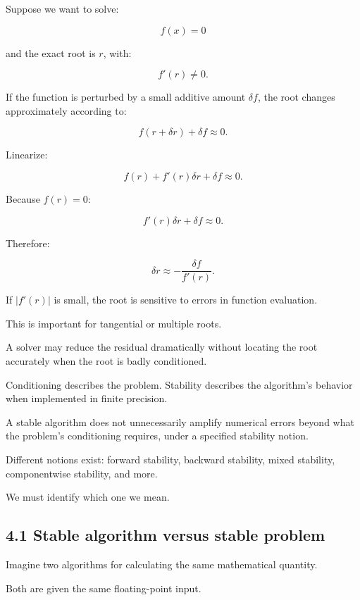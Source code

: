 \hypertarget{02-foundations-ii-ch028-conditioning-of-a-root}{}

Suppose we want to solve:

\[ f(x)=0 \]

and the exact root is \(r\), with:

\[ f'(r)\ne0. \]

If the function is perturbed by a small additive amount \(\delta f\), the root changes approximately according to:

\[ f(r+\delta r)+\delta f\approx0. \]

Linearize:

\[ f(r)+f'(r)\delta r+\delta f\approx0. \]

Because \(f(r)=0\):

\[ f'(r)\delta r+\delta f\approx0. \]

Therefore:

\[ \boxed{ \delta r\approx-\frac{\delta f}{f'(r)} }. \]

If \(|f'(r)|\) is small, the root is sensitive to errors in function evaluation.

This is important for tangential or multiple roots.

A solver may reduce the residual dramatically without locating the root accurately when the root is badly conditioned.

Conditioning describes the problem. Stability describes the algorithm's behavior when implemented in finite precision.

A stable algorithm does not unnecessarily amplify numerical errors beyond what the problem's conditioning requires, under a specified stability notion.

Different notions exist: forward stability, backward stability, mixed stability, componentwise stability, and more.

We must identify which one we mean.

\subsection{4.1 Stable algorithm versus stable problem}\label{02-foundations-ii-ch028-stable-algorithm-versus-stable-problem}

\hypertarget{02-foundations-ii-ch028-stable-algorithm-versus-stable-problem}{}

Imagine two algorithms for calculating the same mathematical quantity.

Both are given the same floating-point input.

